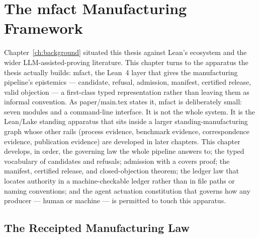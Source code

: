\chapter{The mfact Manufacturing Framework}
\label{ch:mfact}
\label{sec:mfact}

Chapter~\ref{ch:background} situated this thesis against Lean's ecosystem
and the wider LLM-assisted-proving literature. This chapter turns to the
apparatus the thesis actually builds: \textsf{mfact}, the Lean~4 layer
that gives the manufacturing pipeline's epistemics --- candidate,
refusal, admission, manifest, certified release, valid objection --- a
first-class typed representation rather than leaving them as informal
convention. As paper/main.tex states it, \textsf{mfact} is deliberately
small: seven modules and a command-line interface. It is not the whole
system. It is the Lean/Lake standing apparatus that sits inside a larger
standing-manufacturing graph whose other rails (process evidence,
benchmark evidence, correspondence evidence, publication evidence) are
developed in later chapters. This chapter develops, in order, the
governing law the whole pipeline answers to; the typed vocabulary of
candidates and refusals; admission with a covers proof; the manifest,
certified release, and closed-objection theorem; the ledger law that
locates authority in a machine-checkable ledger rather than in file
paths or naming conventions; and the agent actuation constitution that
governs how any producer --- human or machine --- is permitted to touch
this apparatus.

\section{The Receipted Manufacturing Law}
\label{sec:mfact-receipted-law}

